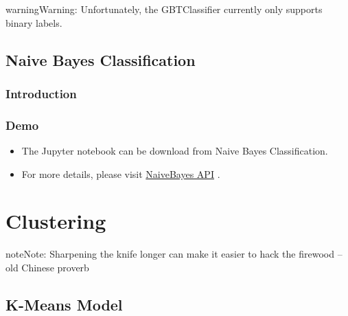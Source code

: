 \documentclass[letterpaper,11pt,english]{sphinxmanual}
\begin{document}
\begin{notice}{warning}{Warning:}
Unfortunately, the GBTClassifier currently only supports binary labels.
\end{notice}


\section{Naive Bayes Classification}
\label{classification:naive-bayes-classification}

\subsection{Introduction}
\label{classification:id9}

\subsection{Demo}
\label{classification:id10}\begin{itemize}
\item {} 
The Jupyter notebook can be download from Naive Bayes Classification.

\item {} 
For more details, please visit \href{http://takwatanabe.me/pyspark/generated/generated/ml.classification.NaiveBayes.html}{NaiveBayes API} .

\end{itemize}


\chapter{Clustering}
\label{clustering:naivebayes-api}\label{clustering:clustering}\label{clustering::doc}\label{clustering:id1}
\begin{notice}{note}{Note:}
Sharpening the knife longer can make it easier to hack the firewood -- old Chinese proverb
\end{notice}


\section{K-Means Model}
\label{clustering:k-means-model}
\end{document}
